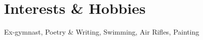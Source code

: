 \documentclass[]{resume-openfont}
\begin{document}
\section{Interests \& Hobbies}
\begin{resumeSkillList}
    Ex-gymnast, Poetry \& Writing, Swimming, Air Rifles, Painting    
\end{resumeSkillList}

\end{document}
